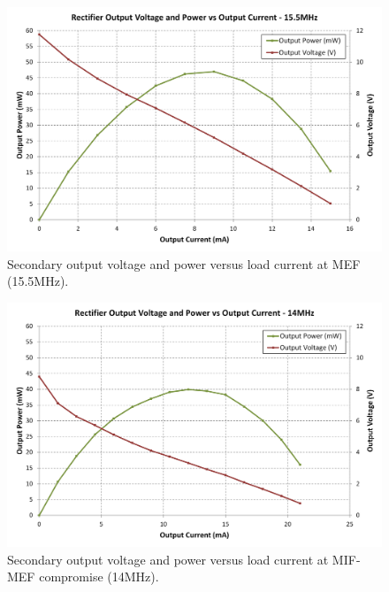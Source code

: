 \documentclass[conference]{IEEEtran}
\begin{document}
	\begin{figure}[t]
		\centering
		\includegraphics[width=1\columnwidth]{./img/VandPvsI}
		\caption{Secondary output voltage and power versus load current at MEF (15.5MHz).}
		\label{fig:VandPvsI}
	\end{figure}
	
	\begin{figure}[t]
		\centering
		\includegraphics[width=1\columnwidth]{./img/VandPvsI_retuned}
		\caption{Secondary output voltage and power versus load current at MIF-MEF compromise (14MHz).}
		\label{fig:VanndPvsI_retuned}
	\end{figure}
	
\end{document}

